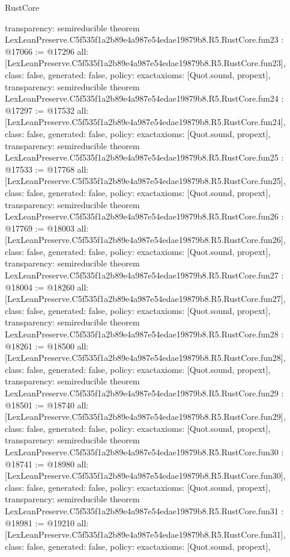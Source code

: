 \begin{lexlean}{RustCore}
\begin{coremodule}
{  transparency: semireducible
}
theorem LexLeanPreserve.C5f535f1a2b89e4a987e54edae19879b8.R5.RustCore.fun23 : @17066 := @17296 {
  all: [LexLeanPreserve.C5f535f1a2b89e4a987e54edae19879b8.R5.RustCore.fun23],
  class: false,
  generated: false,
  policy: exact{axioms: [Quot.sound, propext]},
  transparency: semireducible
}
theorem LexLeanPreserve.C5f535f1a2b89e4a987e54edae19879b8.R5.RustCore.fun24 : @17297 := @17532 {
  all: [LexLeanPreserve.C5f535f1a2b89e4a987e54edae19879b8.R5.RustCore.fun24],
  class: false,
  generated: false,
  policy: exact{axioms: [Quot.sound, propext]},
  transparency: semireducible
}
theorem LexLeanPreserve.C5f535f1a2b89e4a987e54edae19879b8.R5.RustCore.fun25 : @17533 := @17768 {
  all: [LexLeanPreserve.C5f535f1a2b89e4a987e54edae19879b8.R5.RustCore.fun25],
  class: false,
  generated: false,
  policy: exact{axioms: [Quot.sound, propext]},
  transparency: semireducible
}
theorem LexLeanPreserve.C5f535f1a2b89e4a987e54edae19879b8.R5.RustCore.fun26 : @17769 := @18003 {
  all: [LexLeanPreserve.C5f535f1a2b89e4a987e54edae19879b8.R5.RustCore.fun26],
  class: false,
  generated: false,
  policy: exact{axioms: [Quot.sound, propext]},
  transparency: semireducible
}
theorem LexLeanPreserve.C5f535f1a2b89e4a987e54edae19879b8.R5.RustCore.fun27 : @18004 := @18260 {
  all: [LexLeanPreserve.C5f535f1a2b89e4a987e54edae19879b8.R5.RustCore.fun27],
  class: false,
  generated: false,
  policy: exact{axioms: [Quot.sound, propext]},
  transparency: semireducible
}
theorem LexLeanPreserve.C5f535f1a2b89e4a987e54edae19879b8.R5.RustCore.fun28 : @18261 := @18500 {
  all: [LexLeanPreserve.C5f535f1a2b89e4a987e54edae19879b8.R5.RustCore.fun28],
  class: false,
  generated: false,
  policy: exact{axioms: [Quot.sound, propext]},
  transparency: semireducible
}
theorem LexLeanPreserve.C5f535f1a2b89e4a987e54edae19879b8.R5.RustCore.fun29 : @18501 := @18740 {
  all: [LexLeanPreserve.C5f535f1a2b89e4a987e54edae19879b8.R5.RustCore.fun29],
  class: false,
  generated: false,
  policy: exact{axioms: [Quot.sound, propext]},
  transparency: semireducible
}
theorem LexLeanPreserve.C5f535f1a2b89e4a987e54edae19879b8.R5.RustCore.fun30 : @18741 := @18980 {
  all: [LexLeanPreserve.C5f535f1a2b89e4a987e54edae19879b8.R5.RustCore.fun30],
  class: false,
  generated: false,
  policy: exact{axioms: [Quot.sound, propext]},
  transparency: semireducible
}
theorem LexLeanPreserve.C5f535f1a2b89e4a987e54edae19879b8.R5.RustCore.fun31 : @18981 := @19210 {
  all: [LexLeanPreserve.C5f535f1a2b89e4a987e54edae19879b8.R5.RustCore.fun31],
  class: false,
  generated: false,
  policy: exact{axioms: [Quot.sound, propext]},
}
\end{coremodule}
\end{lexlean}
